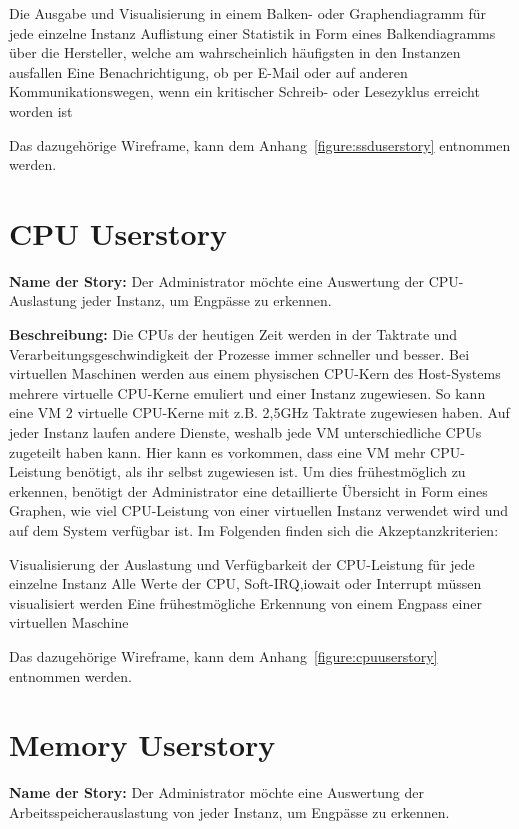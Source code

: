 \begin{outline}
  \1 Die Ausgabe und Visualisierung in einem Balken- oder Graphendiagramm
  für jede einzelne Instanz
  \1 Auflistung einer Statistik in Form eines Balkendiagramms über die
  Hersteller, welche am wahrscheinlich häufigsten in den Instanzen ausfallen
  \1 Eine Benachrichtigung, ob per E-Mail oder auf anderen Kommunikationswegen,
  wenn ein kritischer Schreib- oder Lesezyklus erreicht worden ist
\end{outline}

Das dazugehörige Wireframe, kann dem Anhang~\ref{figure:ssduserstory} entnommen
werden.
\mr%

\section{CPU Userstory}
\label{section:CPU_Userstory}
\textbf{Name der Story:} Der Administrator möchte eine Auswertung der
CPU-Auslastung jeder Instanz, um Engpässe zu erkennen.

\textbf{Beschreibung:} Die CPUs der heutigen Zeit werden in der Taktrate und
Verarbeitungsgeschwindigkeit der Prozesse immer schneller und besser. Bei
virtuellen Maschinen werden aus einem physischen CPU-Kern des Host-Systems
mehrere virtuelle CPU-Kerne emuliert und einer Instanz zugewiesen. So kann eine
VM 2 virtuelle CPU-Kerne mit z.B. 2,5\si{\giga\hertz} Taktrate zugewiesen
haben. Auf jeder Instanz laufen andere Dienste, weshalb jede VM
unterschiedliche CPUs zugeteilt haben kann. Hier kann es vorkommen, dass eine
VM mehr CPU-Leistung benötigt, als ihr selbst zugewiesen ist. Um dies
frühestmöglich zu erkennen, benötigt der Administrator eine detaillierte
Übersicht in Form eines Graphen, wie viel CPU-Leistung von einer virtuellen
Instanz verwendet wird und auf dem System verfügbar ist. Im Folgenden finden
sich die Akzeptanzkriterien:

\begin{outline}
  \1 Visualisierung der Auslastung und Verfügbarkeit der CPU-Leistung für jede
  einzelne Instanz
  \1 Alle Werte der CPU, \gls{Soft-IRQ},\gls{iowait} oder \gls{Interrupt}
  müssen visualisiert werden
  \1 Eine frühestmögliche Erkennung von einem Engpass einer virtuellen Maschine
\end{outline}

Das dazugehörige Wireframe, kann dem Anhang~\ref{figure:cpuuserstory} entnommen
werden.
\mr%

\section{Memory Userstory}
\textbf{Name der Story:} Der Administrator möchte eine Auswertung der
Arbeitsspeicherauslastung von jeder Instanz, um Engpässe zu erkennen.

